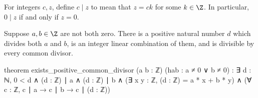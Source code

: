 For integers $c,z$, define $c\mid z$ to mean that $z=ck$ for some
$k\in\Z$. In particular, $0\mid z$ if and only if $z=0$.

\begin{theorem} \label{nt:thm:positive-common-divisor}
  Suppose $a,b\in\Z$ are not both zero. There is a positive natural number $d$ which divides both $a$ and $b$, is an integer linear combination of them, and is divisible by every common divisor.

  \begin{lean}
    theorem exists_positive_common_divisor (a b : ℤ) (hab : a ≠ 0 ∨ b ≠ 0) :
        ∃ d : ℕ, 0 < d ∧ (d : ℤ) ∣ a ∧ (d : ℤ) ∣ b ∧
          (∃ x y : ℤ, (d : ℤ) = a * x + b * y) ∧
          (∀ c : ℤ, c ∣ a → c ∣ b → c ∣ (d : ℤ))
  \end{lean}
\end{theorem}

